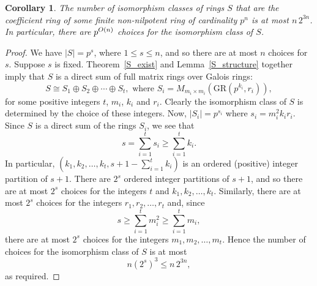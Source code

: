 \documentclass[12pt]{article}
\newtheorem{Cor}[Thm]{Corollary}
\newcommand{\Oh}{\mathnormal{O}}
\begin{document}
\begin{Cor}
\label{S_count}
The number of isomorphism classes of rings $S$ that are the coefficient ring of some finite non-nilpotent ring of cardinality $p^n$ is at most $n\, 2^{3n}$. In particular, there are $p^{\Oh(n)}$ choices for the isomorphism class of $S$.
\end{Cor}
\begin{proof}
We have $|S|=p^s$, where $1\leq s\leq n$, and so there are at most $n$ choices for $s$. Suppose $s$ is fixed. Theorem~\ref{S_exist} and Lemma~\ref{S_structure} together imply that $S$ is a direct sum of full matrix rings over Galois rings:
\[
S\cong S_1\oplus S_2\oplus\cdots \oplus S_t,\text{ where }S_i=M_{m_i\times m_i}(\mathrm{GR}(p^{k_i},r_i)),
\]
for some positive integers $t$, $m_i$, $k_i$ and $r_i$. Clearly the isomorphism class of $S$ is determined by the choice of these integers. Now,
$|S_i|=p^{s_i}$ where $s_i=m_i^2k_ir_i$. Since $S$ is a direct sum of the rings $S_i$, we see that
\[
s=\sum_{i=1}^t s_i\geq \sum_{i=1}^t k_i.
\]
In particular, $(k_1,k_2,\ldots,k_t,s+1-\sum_{i=1}^tk_i)$ is an ordered (positive) integer partition of $s+1$. There are $2^{s}$ ordered integer partitions of $s+1$, and so there are at most $2^s$ choices for the integers $t$ and $k_1,k_2,\ldots ,k_t$. Similarly, there are at most $2^s$ choices for the integers $r_1,r_2,\ldots ,r_t$ and, since
\[
s\geq \sum_{i=1}^t m_i^2\geq \sum_{i=1}^t m_i,
\]
there are at most $2^s$ choices for the integers $m_1,m_2,\ldots ,m_t$. Hence the number of choices for the isomorphism class of $S$ is at most
\[
n(2^{s})^3\leq n\, 2^{3n},
\]
as required.
\end{proof}
\end{document}
